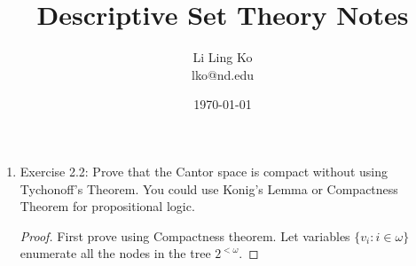\documentclass{article}
\begin{document}
\title{Descriptive Set Theory Notes}
\author{Li Ling Ko\\ lko@nd.edu}
\date{\today}
\maketitle

\begin{enumerate}
  \item Exercise 2.2: Prove that the Cantor space is compact without using
    Tychonoff's Theorem. You could use Konig's Lemma or Compactness Theorem
    for propositional logic.
    \begin{proof}
      First prove using Compactness theorem. Let variables
      $\{v_i:i\in\omega\}$ enumerate all the nodes in the tree $2^{<\omega}$.
    \end{proof}
\end{enumerate}
\end{document}
